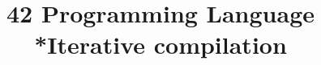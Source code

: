 \documentclass[secfooter,english]{beamer}
\title{42 Programming Language\\*Iterative compilation}
\author{}
\institute{}
\date{}
\begin{document}
\maketitle


\logo{}

\end{document}

